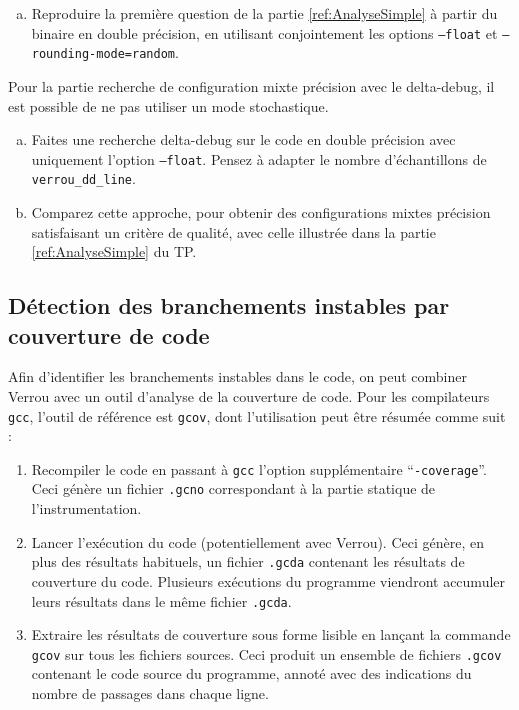 \documentclass[a4paper]{article}
\newcounter{Question}
\newenvironment{question}[1][\unskip]{
  \bigskip
  \stepcounter{Question}
  \def\questionTitle{ #1}
  \begin{mdframed}[style=question]
  }{
  \end{mdframed}
}
\begin{document}
\begin{question}
\begin{enumerate}[(a)]
\item Reproduire la première question de la partie \ref{ref:AnalyseSimple} à partir du binaire en double précision, en utilisant conjointement
  les options \texttt{--float} et \texttt{--rounding-mode=random}.
\end{enumerate}
\end{question}

Pour la partie recherche de configuration mixte précision avec le delta-debug, il est possible de ne pas utiliser un mode stochastique.
\begin{question}
\begin{enumerate}[(a)]
\item Faites une recherche delta-debug sur le code en double précision
  avec uniquement l'option \texttt{--float}.
  Pensez à adapter le nombre d'échantillons de \texttt{verrou\_dd\_line}.
\item Comparez cette approche, pour obtenir des configurations mixtes
  précision satisfaisant un critère de qualité, avec celle illustrée
  dans la partie \ref{ref:AnalyseSimple} du TP.
\end{enumerate}
\end{question}






\subsection{Détection des branchements instables par couverture de code}
\label{cover}

Afin d'identifier les branchements instables dans le code, on peut combiner
Verrou avec un outil d'analyse de la couverture de code. Pour les compilateurs
\texttt{gcc}, l'outil de référence est \texttt{gcov}, dont l'utilisation peut
être résumée comme suit :
\begin{enumerate}
\item Recompiler le code en passant à \texttt{gcc} l'option supplémentaire
  ``\texttt{-coverage}''. Ceci génère un fichier
  \texttt{.gcno} correspondant à la partie statique de l'instrumentation.
\item Lancer l'exécution du code (potentiellement avec Verrou). Ceci génère, en
  plus des résultats habituels, un fichier \texttt{.gcda} contenant les
  résultats de couverture du code. Plusieurs exécutions du programme viendront
  accumuler leurs résultats dans le même fichier \texttt{.gcda}.
\item Extraire les résultats de couverture sous forme lisible en lançant la
  commande \texttt{gcov} sur tous les fichiers sources. Ceci produit un ensemble
  de fichiers \texttt{.gcov} contenant le code source du programme, annoté avec
  des indications du nombre de passages dans chaque ligne.
\end{enumerate}
\end{document}

